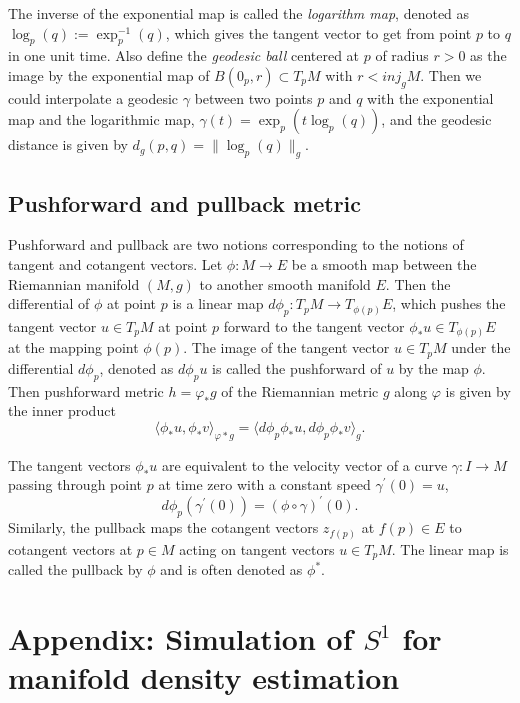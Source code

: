\documentclass[11pt,a4paper,]{article}
\begin{document}
The inverse of the exponential map is called the \emph{logarithm map}, denoted as \(\log_p(q):= \exp^{-1}_p(q)\), which gives the tangent vector to get from point \(p\) to \(q\) in one unit time. Also define the \emph{geodesic ball} centered at \(p\) of radius \(r > 0\) as the image by the exponential map of \(B(0_p, r) \subset T_pM\) with \(r < \textit{inj}_gM\). Then we could interpolate a geodesic \(\gamma\) between two points \(p\) and \(q\) with the exponential map and the logarithmic map, \(\gamma(t) = \exp_p(t\log_p(q))\), and the geodesic distance is given by \(d_g(p,q) = \|\log_p(q)\|_g\).

\hypertarget{pushforward-and-pullback-metric}{%
\subsection{Pushforward and pullback metric}\label{pushforward-and-pullback-metric}}

Pushforward and pullback are two notions corresponding to the notions of tangent and cotangent vectors.
Let \(\phi: M \rightarrow E\) be a smooth map between the Riemannian manifold \((M,g)\) to another smooth manifold \(E\). Then the differential of \(\phi\) at point \(p\) is a linear map \(d\phi_p: T_pM \rightarrow T_{\phi (p)}E\), which pushes the tangent vector \(u \in T_pM\) at point \(p\) forward to the tangent vector \(\phi_*u \in T_{\phi (p)}E\) at the mapping point \(\phi(p)\).
The image of the tangent vector \(u \in T_pM\) under the differential \(d\phi_p\), denoted as \(d\phi_p u\) is called the pushforward of \(u\) by the map \(\phi\).
Then pushforward metric \(h=\varphi_*g\) of the Riemannian metric \(g\) along \(\varphi\) is given by the inner product
\[
\langle \phi_*u,\phi_*v \rangle_{\varphi*g} = \langle d\phi_p \phi_*u, d\phi_p \phi_*v \rangle_{g}.
\]

The tangent vectors \(\phi_*u\) are equivalent to the velocity vector of a curve \(\gamma: I\rightarrow M\) passing through point \(p\) at time zero with a constant speed \(\gamma^{\prime}(0)=u\),
\[
d\phi_p(\gamma^{\prime}(0)) = (\phi \circ \gamma)^\prime (0).
\]
Similarly, the pullback maps the cotangent vectors \(z_{f(p)}\) at \(f(p) \in E\) to cotangent vectors at \(p \in M\) acting on tangent vectors \(u \in T_pM\). The linear map is called the pullback by \(\phi\) and is often denoted as \(\phi^*\).

\hypertarget{s1simulation}{%
\section{\texorpdfstring{Appendix: Simulation of \(S^1\) for manifold density estimation}{Appendix: Simulation of S\^{}1 for manifold density estimation}}\label{s1simulation}}
\end{document}
